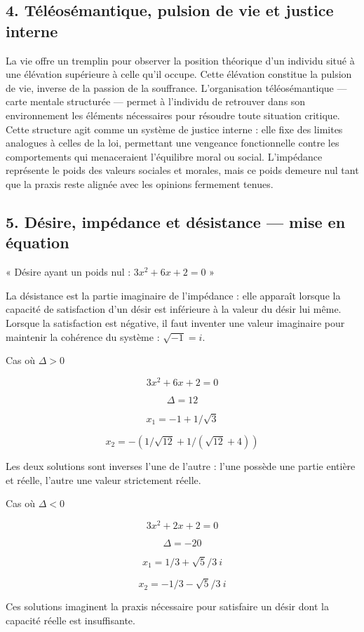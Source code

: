 \documentclass[12pt,a4paper]{article}
\begin{document}
\subsection*{4. Téléosémantique, pulsion de vie et justice interne}
La vie offre un tremplin pour observer la position théorique d’un individu situé à une élévation supérieure à celle qu’il occupe. Cette élévation constitue la pulsion de vie, inverse de la passion de la souffrance. L’organisation téléosémantique — carte mentale structurée — permet à l’individu de retrouver dans son environnement les éléments nécessaires pour résoudre toute situation critique.
Cette structure agit comme un système de justice interne : elle fixe des limites analogues à celles de la loi, permettant une vengeance fonctionnelle contre les comportements qui menaceraient l’équilibre moral ou social. L’impédance représente le poids des valeurs sociales et morales, mais ce poids demeure nul tant que la praxis reste alignée avec les opinions fermement tenues.

\subsection*{5. Désire, impédance et désistance — mise en équation}
« Désire ayant un poids nul : $3x^2+6x+2=0$ »

La désistance est la partie imaginaire de l’impédance : elle apparaît lorsque la capacité de satisfaction d’un désir est inférieure à la valeur du désir lui même. Lorsque la satisfaction est négative, il faut inventer une valeur imaginaire pour maintenir la cohérence du système : $\sqrt{-1} = i$.

Cas où $\Delta > 0$

\[3x^2 + 6x + 2 = 0\]

\[\Delta = 12\]

\[x_1 = -1 + 1/\sqrt{3}\]

\[x_2 = -(1/\sqrt{12} + 1/(\sqrt{12} + 4))\]

Les deux solutions sont inverses l’une de l’autre : l’une possède une partie entière et réelle, l’autre une valeur strictement réelle.

Cas où $\Delta < 0$

\[3x^2 + 2x + 2 = 0\]

\[\Delta = -20\]

\[x_1 = 1/3 + \sqrt{5}/3\ i\]

\[x_2 = -1/3 - \sqrt{5}/3\ i\]

Ces solutions imaginent la praxis nécessaire pour satisfaire un désir dont la capacité réelle est insuffisante.
\end{document}
